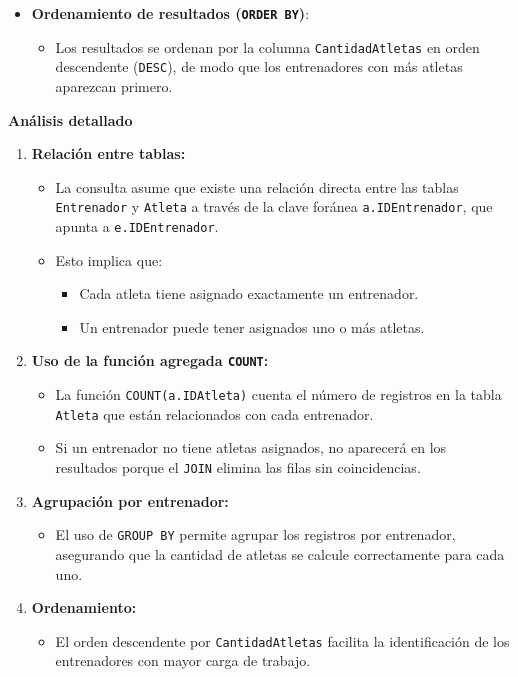 \begin{itemize}
   \item \textbf{Ordenamiento de resultados (\texttt{ORDER BY})}:
   \begin{itemize}
       \item Los resultados se ordenan por la columna \texttt{CantidadAtletas} en orden descendente (\texttt{DESC}), de modo que los entrenadores con más atletas aparezcan primero.
   \end{itemize}
\end{itemize}

\textbf{Análisis detallado}

\begin{enumerate}
   \item \textbf{Relación entre tablas:}
   \begin{itemize}
       \item La consulta asume que existe una relación directa entre las tablas \texttt{Entrenador} y \texttt{Atleta} a través de la clave foránea \texttt{a.IDEntrenador}, que apunta a \texttt{e.IDEntrenador}.
       \item Esto implica que:
       \begin{itemize}
           \item Cada atleta tiene asignado exactamente un entrenador.
           \item Un entrenador puede tener asignados uno o más atletas.
       \end{itemize}
   \end{itemize}
   
   \item \textbf{Uso de la función agregada \texttt{COUNT}:}
   \begin{itemize}
       \item La función \texttt{COUNT(a.IDAtleta)} cuenta el número de registros en la tabla \texttt{Atleta} que están relacionados con cada entrenador.
       \item Si un entrenador no tiene atletas asignados, no aparecerá en los resultados porque el \texttt{JOIN} elimina las filas sin coincidencias.
   \end{itemize}
   
   \item \textbf{Agrupación por entrenador:}
   \begin{itemize}
       \item El uso de \texttt{GROUP BY} permite agrupar los registros por entrenador, asegurando que la cantidad de atletas se calcule correctamente para cada uno.
   \end{itemize}
   
   \item \textbf{Ordenamiento:}
   \begin{itemize}
       \item El orden descendente por \texttt{CantidadAtletas} facilita la identificación de los entrenadores con mayor carga de trabajo.
   \end{itemize}
\end{enumerate}

